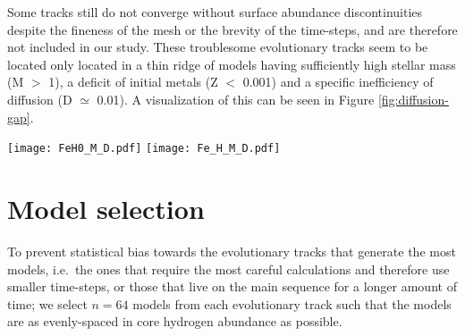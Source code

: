 \documentclass[manuscript,linenumbers]{aastex6}
\begin{document}
Some tracks still do not converge without surface abundance discontinuities despite the fineness of the mesh or the brevity of the time-steps, and are therefore not included in our study. These troublesome evolutionary tracks seem to be located only located in a thin ridge of models having sufficiently high stellar mass (M $>$ 1), a deficit of initial metals (Z $<$ 0.001) and a specific inefficiency of diffusion (D $\simeq$ 0.01). A visualization of this can be seen in Figure \ref{fig:diffusion-gap}.

\begin{figure*}
    \centering
    \texttt{[image: FeH0\_M\_D.pdf]}\hfill
    \texttt{[image: Fe\_H\_M\_D.pdf]}
    \caption{Stellar mass as a function of diffusion factor colored by initial surface metallicity (left) and final surface metallicity (right). A ridge of unconverged evolutionary tracks can be seen around a diffusion factor of 0.01. Beyond this ridge, tracks that were initially metal-poor end their main-sequence lives with all of their metals drained from their surfaces. \label{fig:diffusion-gap} }
\end{figure*}


\section{Model selection}
\label{sec:selection}
To prevent statistical bias towards the evolutionary tracks that generate the most models, i.e.\ the ones that require the most careful calculations and therefore use smaller time-steps, or those that live on the main sequence for a longer amount of time; we select $n=64$ models from each evolutionary track such that the models are as evenly-spaced in core hydrogen abundance as possible. 
\end{document}
